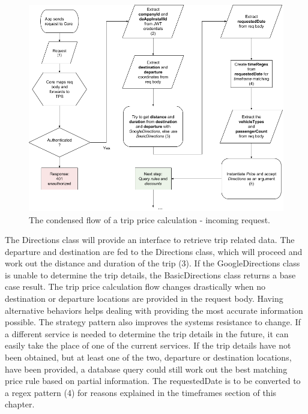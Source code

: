 \begin{figure}[H]
	\centering
	\includegraphics[width=1\textwidth]{IncomingRequest}
	\caption[Incoming Request]{The condensed flow of a trip price calculation - incoming request.}
	\label{fig:Incoming Request}
\end{figure}

The Directions class will provide an interface to retrieve trip related data. The departure and destination are fed to the Directions class, which will proceed and work out the distance and duration of the trip (3). If the GoogleDirections class is unable to determine the trip details, the BasicDirections class returns a base case result. The trip price calculation flow changes drastically when no destination or departure locations are provided in the request body. Having alternative behaviors helps dealing with providing the most accurate information possible. The strategy pattern also improves the systems resistance to change. If a different service is needed to determine the trip details in the future, it can easily take the place of one of the current services. If the trip details have not been obtained, but at least one of the two, departure or destination locations, have been provided, a database query could still work out the best matching price rule based on partial information. The requestedDate is to be converted to a regex pattern (4) for reasons explained in the timeframes section of this chapter.

